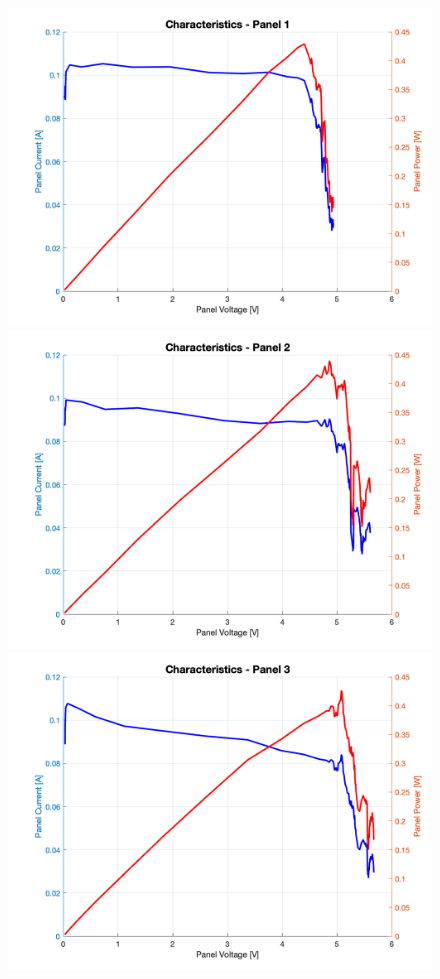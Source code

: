 \documentclass[a4paper]{article}
\begin{document}
    \begin{figure}[H]
    \centering
    \includegraphics[scale=0.18]{Panel1.png}
    \includegraphics[scale=0.18]{Panel2.png}
    \includegraphics[scale=0.18]{Panel3.png}

\end{figure}
\end{document}
